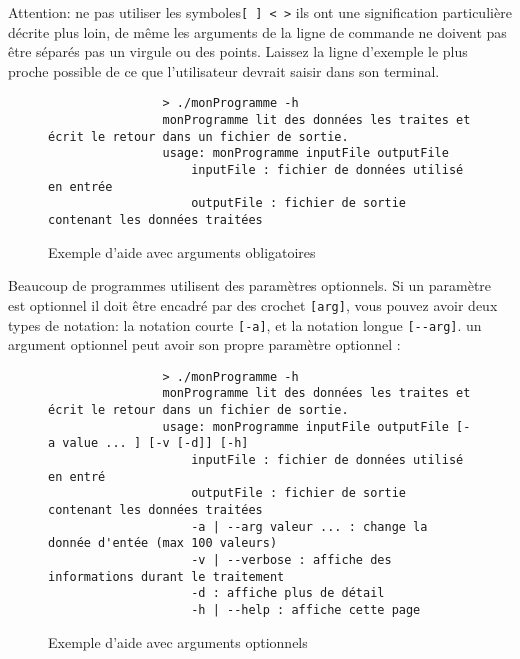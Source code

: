 		Attention: ne pas utiliser les symboles\verb+[ ] < >+ ils ont une signification particulière décrite plus loin, de même les arguments de la ligne de commande ne doivent pas être séparés pas un virgule ou des points. Laissez la ligne d'exemple le plus proche possible de ce que l’utilisateur devrait saisir dans son terminal.

		\begin{figure}[H]
			\begin{changemargin}{-2.5cm}{-2.5cm}
			\begin{tcolorbox}
			\begin{verbatim}
				> ./monProgramme -h
				monProgramme lit des données les traites et écrit le retour dans un fichier de sortie.
				usage: monProgramme inputFile outputFile
				    inputFile : fichier de données utilisé en entrée
				    outputFile : fichier de sortie contenant les données traitées
			\end{verbatim}
			\end{tcolorbox}
			\end{changemargin}
			\caption{Exemple d'aide avec arguments obligatoires}
		\end{figure}

		Beaucoup de programmes utilisent des paramètres optionnels. Si un paramètre est optionnel il doit être encadré par des crochet \verb+[arg]+, vous pouvez avoir deux types de notation: la notation courte \verb+[-a]+, et la notation longue \verb+[--arg]+. un argument optionnel peut avoir son propre paramètre optionnel :

		\begin{figure}[H]
			\begin{changemargin}{-2.5cm}{-2.5cm}
			\begin{tcolorbox}
			\begin{verbatim}
				> ./monProgramme -h
				monProgramme lit des données les traites et écrit le retour dans un fichier de sortie.
				usage: monProgramme inputFile outputFile [-a value ... ] [-v [-d]] [-h]
				    inputFile : fichier de données utilisé en entré
				    outputFile : fichier de sortie contenant les données traitées
				    -a | --arg valeur ... : change la donnée d'entée (max 100 valeurs)
				    -v | --verbose : affiche des informations durant le traitement
				    -d : affiche plus de détail
				    -h | --help : affiche cette page
			\end{verbatim}
			\end{tcolorbox}
			\end{changemargin}
			\caption{Exemple d'aide avec arguments optionnels}
		\end{figure}

